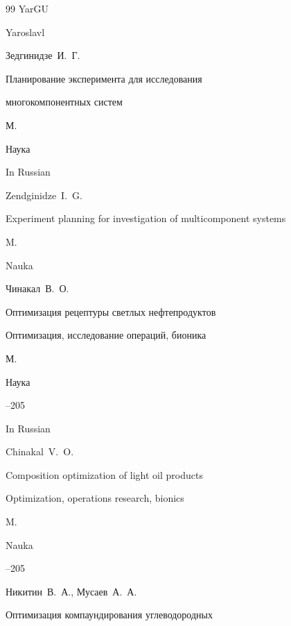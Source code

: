 \begin{thebibliography}{99}
\publ YarGU

\publaddr Yaroslavl







\by Зедгинидзе~И.~Г.

\book Планирование эксперимента для исследования

многокомпонентных систем

\publaddr М.

\publ Наука



\misctransl

\lang In Russian

\by Zendginidze~I.~G.

\book Experiment planning for investigation of multicomponent systems

\publaddr M.

\publ Nauka






\by Чинакал~В.~О.

\paper Оптимизация рецептуры светлых нефтепродуктов

\inbook Оптимизация, исследование операций, бионика

\publaddr М.

\publ Наука


--205

\misctransl

\lang In Russian

\by Chinakal~V.~O.

\paper Composition optimization of light oil products

\inbook Optimization, operations research, bionics

\publaddr M.

\publ Nauka


--205




\by Никитин~В.~А., Мусаев~А.~А.

\paper  Оптимизация компаундирования углеводородных


\end{thebibliography}
